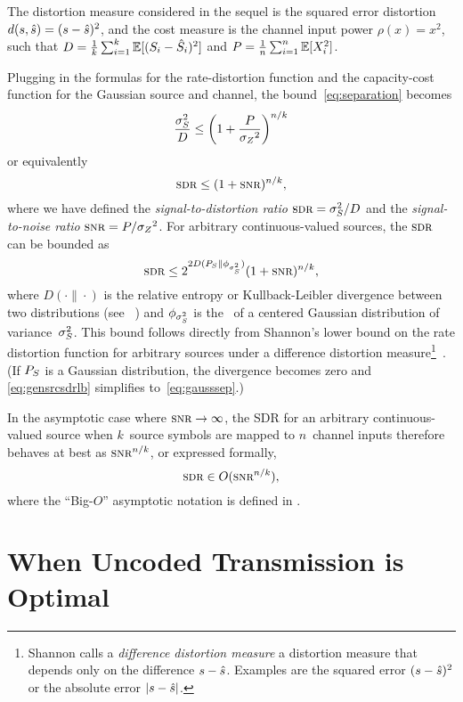 The distortion measure considered in the sequel is the squared error distortion
$d(s,{\hat{s}}) = (s - {\hat{s}})^2$, and the cost measure is the channel input power
$\rho(x) = x^2$, such that $D = \frac1k \sum_{i=1}^k \mathbb{E}[(S_i - {\hat{S}}_i)^2]$ and $P
= \frac1n \sum_{i=1}^n \mathbb{E}[X_i^2]$.

Plugging in the formulas for the rate-distortion function and the capacity-cost
function for the Gaussian source and channel, the bound~\eqref{eq:separation}
becomes
\begin{equation}
  \label{eq:gausssep}
  \frac{{\sigma_S^2}}{D} \le \left( 1 + \frac{P}{{{\sigma_Z}^2}} \right)^{n/k}
\end{equation}
or equivalently
\begin{equation}
  \label{eq:gausssepsdr}
  \sdr \le (1 + \snr)^{n/k},
\end{equation}
where we have defined the \emph{signal-to-distortion ratio} $\sdr = \ssq/D$ and
the \emph{signal-to-noise ratio} $\snr = P/\szq$.  For arbitrary
continuous-valued sources, the $\sdr$ can be bounded as
\begin{equation}
  \label{eq:gensrcsdrlb}
  \sdr \le 2^{2 D(\ps \| \phi_{\ssq})} (1 + \snr)^{n/k},
\end{equation}
where $D(\cdot\|\cdot)$ is the relative entropy or Kullback-Leibler divergence
between two distributions (see \eg~\cite{CoverT1991}) and $\phi_{{\sigma_S^2}}$ is the
\pdf\ of a centered Gaussian distribution of variance~${\sigma_S^2}$. This bound
follows directly from Shannon's lower bound on the rate distortion function for
arbitrary sources under a difference distortion measure\footnote{Shannon calls a
\emph{difference distortion measure} a distortion measure that depends only on
the difference $s - {\hat{s}}$. Examples are the squared error $(s-{\hat{s}})^2$ or the
absolute error $|s - {\hat{s}}|$.}~\cite{Shannon1959}.
(If ${P_S}$ is a Gaussian distribution, the divergence becomes zero and
\eqref{eq:gensrcsdrlb} simplifies to~\eqref{eq:gausssep}.) 

In the asymptotic case where $\snr \ra \infty$, the SDR for an arbitrary
continuous-valued source when $k$~source symbols are mapped to $n$~channel
inputs therefore behaves at best as $\snr^{n/k}$, or expressed formally,
\[ \sdr \in O(\snr^{n/k}), \]
where the ``Big-$O$'' asymptotic notation is defined in .


\section{When Uncoded Transmission is Optimal}\label{sec:gaussuncoded}

